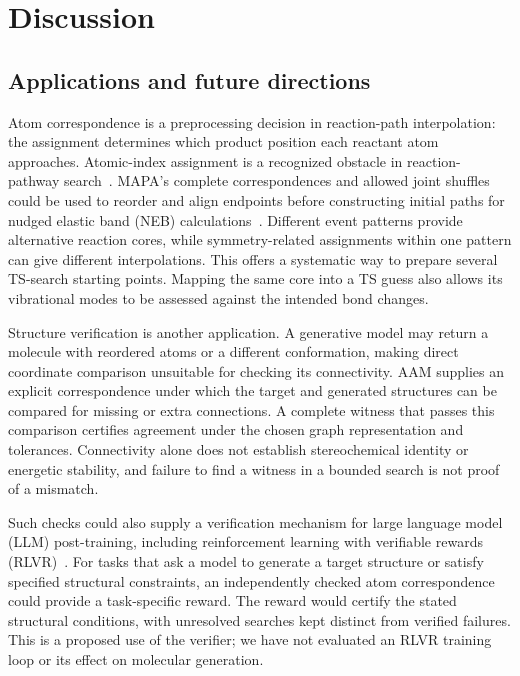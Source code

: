 \FloatBarrier
\section{Discussion}

\subsection{Applications and future directions}

Atom correspondence is a preprocessing decision in reaction-path interpolation: the assignment determines which product position each reactant atom approaches. Atomic-index assignment is a recognized obstacle in reaction-pathway search~\citep{de2019}. MAPA's complete correspondences and allowed joint shuffles could be used to reorder and align endpoints before constructing initial paths for nudged elastic band (NEB) calculations~\citep{henkelman2000}. Different event patterns provide alternative reaction cores, while symmetry-related assignments within one pattern can give different interpolations. This offers a systematic way to prepare several TS-search starting points. Mapping the same core into a TS guess also allows its vibrational modes to be assessed against the intended bond changes.

Structure verification is another application. A generative model may return a molecule with reordered atoms or a different conformation, making direct coordinate comparison unsuitable for checking its connectivity. AAM supplies an explicit correspondence under which the target and generated structures can be compared for missing or extra connections. A complete witness that passes this comparison certifies agreement under the chosen graph representation and tolerances. Connectivity alone does not establish stereochemical identity or energetic stability, and failure to find a witness in a bounded search is not proof of a mismatch.

Such checks could also supply a verification mechanism for large language model (LLM) post-training, including reinforcement learning with verifiable rewards (RLVR)~\citep{lambert2024}. For tasks that ask a model to generate a target structure or satisfy specified structural constraints, an independently checked atom correspondence could provide a task-specific reward. The reward would certify the stated structural conditions, with unresolved searches kept distinct from verified failures. This is a proposed use of the verifier; we have not evaluated an RLVR training loop or its effect on molecular generation.

